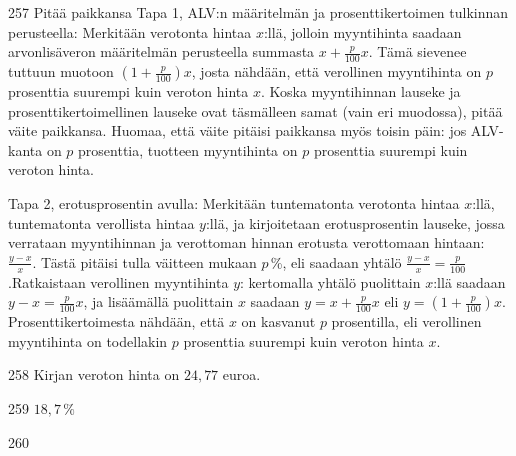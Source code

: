 \begin{Vastaus}{257}
	Pitää paikkansa
	 Tapa 1, ALV:n määritelmän ja prosenttikertoimen tulkinnan perusteella: Merkitään verotonta hintaa $x$:llä, jolloin myyntihinta saadaan arvonlisäveron määritelmän perusteella summasta $x+\frac{p}{100}x$. Tämä sievenee tuttuun muotoon $(1+\frac{p}{100})x$, josta nähdään, että verollinen myyntihinta on $p$ prosenttia suurempi kuin veroton hinta $x$. Koska myyntihinnan lauseke ja prosenttikertoimellinen lauseke ovat täsmälleen samat (vain eri muodossa), pitää väite paikkansa. Huomaa, että väite pitäisi paikkansa myös toisin päin: jos ALV-kanta on $p$ prosenttia, tuotteen myyntihinta on $p$ prosenttia suurempi kuin veroton hinta.

	Tapa 2, erotusprosentin avulla: Merkitään tuntematonta verotonta hintaa $x$:llä, tuntematonta verollista hintaa $y$:llä, ja kirjoitetaan erotusprosentin lauseke, jossa verrataan myyntihinnan ja verottoman hinnan erotusta verottomaan hintaan: $\frac{y-x}{x}$. Tästä pitäisi tulla väitteen mukaan $p$\,\%, eli saadaan yhtälö $\frac{y-x}{x}=\frac{p}{100}$.Ratkaistaan verollinen myyntihinta $y$: kertomalla yhtälö puolittain $x$:llä saadaan $y-x=\frac{p}{100}x$, ja lisäämällä puolittain $x$ saadaan $y=x+\frac{p}{100}x$ eli $y=(1+\frac{p}{100})x$. Prosenttikertoimesta nähdään, että $x$ on kasvanut $p$ prosentilla, eli verollinen myyntihinta on todellakin $p$ prosenttia suurempi kuin veroton hinta $x$.
	
\end{Vastaus}
\begin{Vastaus}{258}
        Kirjan veroton hinta on $24,77$ euroa.
    
\end{Vastaus}
\begin{Vastaus}{259}
        $18,7\,\%$
    
\end{Vastaus}
\begin{Vastaus}{260}
	
\end{Vastaus}
